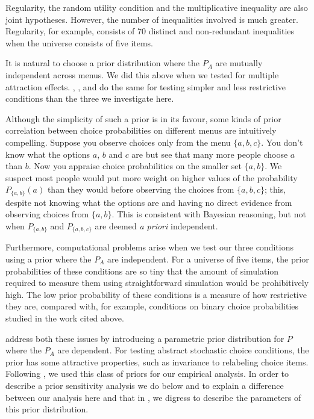 \documentclass[11pt,letter]{article}
\newcommand{\menu}{menu}
\newcommand{\menus}{menus}
\begin{document}
Regularity, the random utility condition and the multiplicative inequality are also joint hypotheses.
However, the number of inequalities involved is much greater.
Regularity, for example, consists of 70 distinct and non-redundant inequalities when the universe consists of five items.

It is natural to choose a prior distribution where the $P_A$ are mutually independent across \menus{}.
We did this above when we tested for multiple attraction effects.
\citet{CavaDavi14}, \citet{DaviBrowCava15}, \citet{MyunKaraIver05} and \citet{ZwilCavaRege11} do the same for testing simpler and less restrictive conditions than the three we investigate here.

Although the simplicity of such a prior is in its favour, some kinds of prior correlation between choice probabilities on different \menus{} are intuitively compelling.
Suppose you observe choices only from the \menu{} $\{a,b,c\}$.
You don't know what the options $a$, $b$ and $c$ are but see that many more people choose $a$ than $b$.
Now you appraise choice probabilities on the smaller set $\{a,b\}$.
We suspect most people would put more weight on higher values of the probability $P_{\{a,b\}}(a)$ than they would before observing the choices from $\{a,b,c\}$; this, despite not knowing what the options are and having no direct evidence from observing choices from $\{a,b\}$.
This is consistent with Bayesian reasoning, but not when $P_{\{a,b\}}$ and $P_{\{a,b,c\}}$ are deemed {\em a priori} independent.

Furthermore, computational problems arise when we test our three conditions using a prior where the $P_A$ are independent.
For a universe of five items, the prior probabilities of these conditions are so tiny that the amount of simulation required to measure them using straightforward simulation would be prohibitively high.
The low prior probability of these conditions is a measure of how restrictive they are, compared with, for example, conditions on binary choice probabilities studied in the work cited above.

\citet{McCaMarl13} address both these issues by introducing a parametric prior distribution for $P$ where the $P_A$ are dependent.
For testing abstract stochastic choice conditions, the prior has some attractive properties, such as invariance to relabeling choice items.
Following \citet{McCaMarl14}, we used this class of priors for our empirical analysis.
In order to describe a prior sensitivity analysis we do below and to explain a difference between our analysis here and that in \citet{McCaMarl14}, we digress to describe the parameters of this prior distribution.
\end{document}
